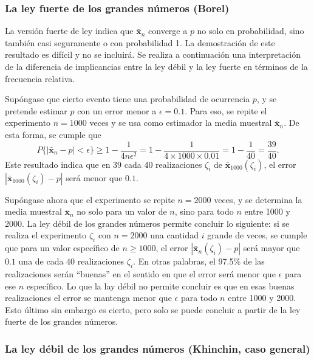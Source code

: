 \documentclass[a4paper]{report}
\newcommand{\x}{\mathbf{x}}
\begin{document}
\subsubsection{La ley fuerte de los grandes números (Borel)}

La versión fuerte de ley indica que \(\bar{\x}_n\) converge a \(p\) no solo en probabilidad, sino también casi seguramente o con probabilidad 1. La demostración de este resultado es difícil y no se incluirá. Se realiza a continuación una interpretación de la diferencia de implicancias entre la ley débil y la ley fuerte en términos de la frecuencia relativa.

Supóngase que cierto evento tiene una probabilidad de ocurrencia \(p\), y se pretende estimar \(p\) con un error menor a \(\epsilon=0.1\). Para eso, se repite el experimento \(n=1000\) veces y se usa como estimador la media muestral \(\bar{\x}_n\). De esta forma, se cumple que
\[
 P\{|\bar{\x}_n-p|<\epsilon\}\geq1-\frac{1}{4n\epsilon^2}=1-\frac{1}{4\times1000\times0.01}=1-\frac{1}{40}=\frac{39}{40}.
\]
Este resultado indica que en 39 cada 40 realizaciones \(\zeta_i\) de \(\bar{\x}_{1000}(\zeta_i)\), el error \(|\bar{\x}_{1000}(\zeta_i)-p|\) será menor que \(0.1\).

Supóngase ahora que el experimento se repite \(n=2000\) veces, y se determina la media muestral \(\bar{\x}_n\) no solo para un valor de \(n\), sino para todo \(n\) entre 1000 y 2000. La ley débil de los grandes números permite concluir lo siguiente: si se realiza el experimento \(\zeta_i\) con \(n=2000\) una cantidad \(i\) grande de veces, se cumple que para un valor específico de \(n\geq 1000\), el error \(|\bar{\x}_n(\zeta_i)-p|\) será mayor que \(0.1\) una de cada 40 realizaciones \(\zeta_i\). En otras palabras, el 97.5\% de las realizaciones serán ``buenas'' en el sentido en que el error será menor que \(\epsilon\) para ese \(n\) específico. 
Lo que la lay débil no permite concluir es que en esas buenas realizaciones el error se mantenga menor que \(\epsilon\) para todo \(n\) entre 1000 y 2000. Esto último sin embargo es cierto, pero  solo se puede concluir a partir de la ley fuerte de los grandes números.

\subsubsection{La ley débil de los grandes números (Khinchin, caso general)}
\end{document}

